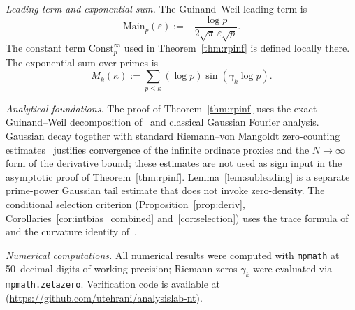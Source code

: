 \documentclass[11pt]{article}
\begin{document}
\emph{Leading term and exponential sum.}
The Guinand--Weil leading term is
\[
\mathrm{Main}_p(\varepsilon):=
-\frac{\log p}{2\sqrt{\pi}\,\varepsilon\sqrt{p}}.
\]
The constant term $\mathrm{Const}_p^\infty$ used in
Theorem~\ref{thm:rpinf} is defined locally there.
The exponential sum over primes is
\[
M_k(\kappa):=\sum_{p\le\kappa}(\log p)\sin(\gamma_k\log p).
\]

\medskip
\emph{Analytical foundations.}
The proof of Theorem~\ref{thm:rpinf} uses the exact Guinand--Weil
decomposition of~\cite{Paper6} and classical Gaussian Fourier analysis.
Gaussian decay together with standard Riemann--von Mangoldt zero-counting
estimates~\cite[Thm.\,5.8]{IwaniecKowalski04} justifies convergence of
the infinite ordinate proxies and the $N\to\infty$ form of the
derivative bound; these estimates are not used as sign input in the
asymptotic proof of Theorem~\ref{thm:rpinf}.
Lemma~\ref{lem:subleading} is a separate prime-power Gaussian tail
estimate that does not invoke zero-density.
The conditional selection criterion (Proposition~\ref{prop:deriv},
Corollaries~\ref{cor:intbias_combined} and~\ref{cor:selection})
uses the trace formula of~\cite{Paper5}
and the curvature identity of~\cite{Paper6}.

\medskip
\emph{Numerical computations.}
All numerical results were computed with \texttt{mpmath} at 50~decimal
digits of working precision; Riemann zeros $\gamma_k$ were evaluated
via \texttt{mpmath.zetazero}.
Verification code is available at~\cite{Code}
(\url{https://github.com/utehrani/analysislab-nt}).
\end{document}
